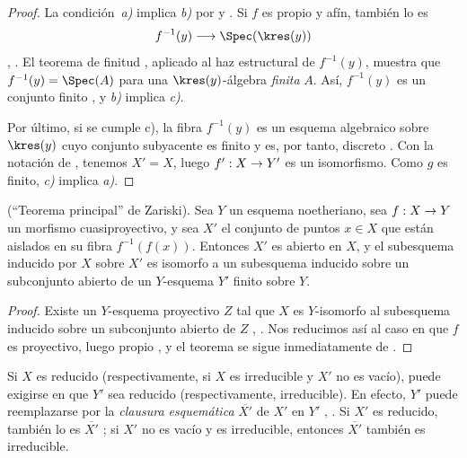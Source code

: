 \documentclass[oneside]{amsart}
\makeatletter
\newcommand{\ega@arrow}[2]{\mathchoice{#1}{#2}{#2}{#2}}
\renewcommand{\to}{\ega@arrow{\longrightarrow}{\rightarrow}}
\let\EGAOriginalLabel\label
\renewcommand{\label}[1]{\phantomsection\EGAOriginalLabel{#1}}
\makeatother
\begin{document}
\begin{proof}
La condición~\emph{a)} implica \emph{b)} por  y
. Si $f$ es propio y afín, también lo es
\[
  f^{-1}(y)\longrightarrow\Spec(\kres(y))
\]
, . El teorema de finitud
, aplicado al haz estructural de $f^{-1}(y)$, muestra
que $f^{-1}(y)=\Spec(A)$ para una $\kres(y)$-álgebra \emph{finita} $A$. Así,
$f^{-1}(y)$ es un conjunto finito , y \emph{b)} implica
\emph{c)}.

Por último, si se cumple c), la fibra $f^{-1}(y)$ es un esquema
algebraico sobre $\kres(y)$ cuyo conjunto subyacente es finito y es,
por tanto, discreto . Con la notación de
, tenemos $X'=X$, luego
$f':X\to Y'$ es un isomorfismo. Como $g$ es finito, \emph{c)} implica \emph{a)}.
\end{proof}

\begin{theorem}[4.4.3]
\label{III.4.4.3}
\textnormal{(``Teorema principal'' de Zariski).}
Sea $Y$ un esquema noetheriano, sea $f:X\to Y$ un morfismo
cuasiproyectivo, y sea $X'$ el conjunto de puntos $x\in X$ que están
aislados en su fibra $f^{-1}(f(x))$. Entonces $X'$ es abierto en $X$,
y el subesquema inducido por $X$ sobre $X'$ es isomorfo a un
subesquema inducido sobre un subconjunto abierto de un $Y$-esquema
$Y'$ finito sobre $Y$.
\end{theorem}

\begin{proof}
Existe un $Y$-esquema proyectivo $Z$ tal que $X$ es
$Y$-isomorfo al subesquema inducido sobre un subconjunto abierto de
$Z$ , . Nos reducimos así al
caso en que $f$ es proyectivo, luego propio , y el
teorema se sigue inmediatamente de
.
\end{proof}

\begin{remark}[4.4.4]
\label{III.4.4.4}
Si $X$ es reducido (respectivamente, si $X$ es irreducible y $X'$ no
es vacío), puede exigirse en  que $Y'$ sea reducido
(respectivamente, irreducible). En efecto, $Y'$ puede reemplazarse por
la \emph{clausura esquemática} $\overline{X'}$ de $X'$ en $Y'$
, . Si $X'$ es reducido, también
lo es $\overline{X'}$ ; si $X'$ no es vacío y es
irreducible, entonces $\overline{X'}$ también es irreducible.
\end{remark}
\end{document}
